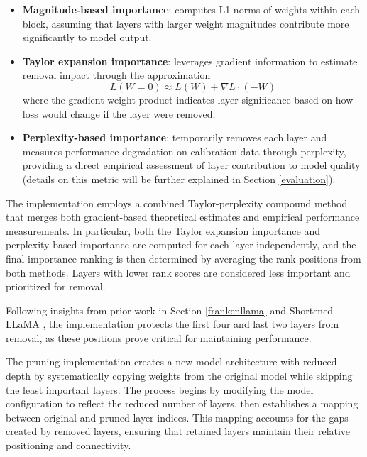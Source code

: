 \begin{itemize}
   \item \textbf{Magnitude-based importance}: computes L1 norms of weights within each block, assuming that layers with larger weight magnitudes contribute more significantly to model output.
   
   \item \textbf{Taylor expansion importance}: leverages gradient information to estimate removal impact through the approximation 
   \begin{equation}
    L(W = 0) \approx L(W) + \nabla L \cdot (-W)
   \end{equation}
   where the gradient-weight product indicates layer significance based on how loss would change if the layer were removed.
   
   \item \textbf{Perplexity-based importance}: temporarily removes each layer and measures performance degradation on calibration data through perplexity, providing a direct empirical assessment of layer contribution to model quality (details on this metric will be further explained in Section \ref{evaluation}).
\end{itemize}

The implementation employs a combined Taylor-perplexity compound method that merges both gradient-based theoretical estimates and empirical performance measurements. In particular, both the Taylor expansion importance and perplexity-based importance are computed for each layer independently, and the final importance ranking is then determined by averaging the rank positions from both methods. Layers with lower rank scores are considered less important and prioritized for removal.

Following insights from prior work in Section \ref{frankenllama} and Shortened-LLaMA \cite{shortened_llama}, the implementation protects the first four and last two layers from removal, as these positions prove critical for maintaining performance.

The pruning implementation creates a new model architecture with reduced depth by systematically copying weights from the original model while skipping the least important layers. The process begins by modifying the model configuration to reflect the reduced number of layers, then establishes a mapping between original and pruned layer indices. This mapping accounts for the gaps created by removed layers, ensuring that retained layers maintain their relative positioning and connectivity.

